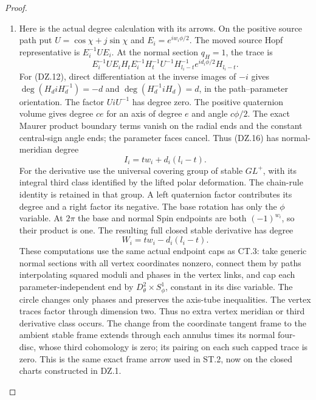 \begin{proof}
\begin{enumerate}[label=\arabic*.]
\item Here is the actual degree calculation with its arrows. On the
positive source path put \(U=\cos\chi+j\sin\chi\) and
\(E_i=e^{iw_i\phi/2}\). The moved source Hopf representative is
\(E_i^{-1}UE_i\). At the normal section \(q_H=1\), the trace is
\[
 E_i^{-1}UE_i H_t E_i^{-1}H_t^{-1}U^{-1}
              H_{l_i-t}^{-1}e^{id_i\phi/2}H_{l_i-t}. \tag{DZ.16}
\]
For (DZ.12), direct differentiation at the inverse images of
\(-i\) gives
\(\deg(H_diH_d^{-1})=-d\) and
\(\deg(H_d^{-1}iH_d)=d\), in the path--parameter orientation.
The factor \(UiU^{-1}\) has degree zero. The positive quaternion
volume gives degree \(c e\) for an axis of degree \(e\) and angle
\(c\phi/2\). The exact Maurer product boundary terms vanish on
the radial ends and the constant central-sign angle ends; the
parameter faces cancel. Thus (DZ.16) has normal-meridian degree
\[
                    I_i=t w_i+d_i(l_i-t).            \tag{DZ.17}
\]
For the derivative use the universal covering group of stable
\(GL^+\), with its integral third class identified by the lifted
polar deformation. The chain-rule identity is retained in that
group. A left quaternion factor contributes its degree and a right
factor its negative. The base rotation has only the \(\phi\)
variable. At \(2\pi\) the base and normal Spin endpoints are both
\((-1)^{w_i}\), so their product is one. The resulting full
closed stable derivative has degree
\[
                    W_i=t w_i-d_i(l_i-t).            \tag{DZ.18}
\]
These computations use the same actual endpoint caps as CT.3:
take generic normal sections with all vertex coordinates nonzero,
connect them by paths interpolating squared moduli and phases in
the vertex links, and cap each parameter-independent end by
\(D^2_\theta\times S^1_\phi\), constant in its disc variable.
The circle changes only phases and preserves the axis-tube
inequalities. The vertex traces factor through dimension two.
Thus no extra vertex meridian or third derivative class occurs.
The change from the coordinate tangent frame to the ambient
stable frame extends through each annulus times its normal
four-disc, whose third cohomology is zero; its pairing on each
such capped trace is zero. This is the same exact frame arrow
used in ST.2, now on the closed charts constructed in DZ.1.


\end{enumerate}
\end{proof}
